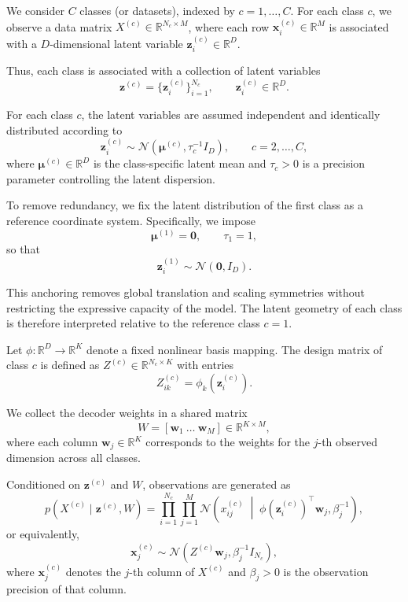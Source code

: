 

\newcommand{\vect}[1]{\bm{#1}}
\newcommand{\normsq}[1]{\left\lVert #1 \right\rVert^2}
\newcommand{\trans}[1]{#1^\top}
\newcommand{\Gam}[3]{\mathrm{Gamma} \left( #1 \;\middle|\; #2, #3\right)}
\newcommand{\Nor}[3]{\mathcal{N} \left( #1 \;\middle|\; #2, #3 \right)}
\newcommand{\avgz}{\overline{z}}
\newcommand{\avgzz}{\overline{zz}}

We consider $C$ classes (or datasets), indexed by $c = 1, \dots, C$.
For each class $c$, we observe a data matrix
$X^{(c)} \in \mathbb{R}^{N_c \times M}$, where each row
$\vect{x}_i^{(c)} \in \mathbb{R}^M$ is associated with a
$D$-dimensional latent variable $\vect{z}_i^{(c)} \in \mathbb{R}^D$.

Thus, each class is associated with a collection of latent variables
\[
    \vect{z}^{(c)} = \{\vect{z}_i^{(c)}\}_{i=1}^{N_c},
    \qquad \vect{z}_i^{(c)} \in \mathbb{R}^D.
\]

For each class $c$, the latent variables are assumed independent and identically distributed according to
\[
    \vect{z}_i^{(c)}
    \sim
    \mathcal{N}\!\left(\vect{\mu}^{(c)}, \tau_c^{-1} I_D \right),
    \qquad
    c = 2, \dots, C,
\]
where $\vect{\mu}^{(c)} \in \mathbb{R}^D$ is the class-specific latent mean and
$\tau_c > 0$ is a precision parameter controlling the latent dispersion.

To remove redundancy, we fix the latent distribution of the first class
as a reference coordinate system.
Specifically, we impose
\[
    \vect{\mu}^{(1)} = \vect{0},
    \qquad
    \tau_1 = 1,
\]
so that
\[
    \vect{z}_i^{(1)} \sim \mathcal{N}(\vect{0}, I_D).
\]

This anchoring removes global translation and scaling symmetries
without restricting the expressive capacity of the model.
The latent geometry of each class is therefore interpreted
relative to the reference class $c=1$.

Let $\phi: \mathbb{R}^D \to \mathbb{R}^K$ denote a fixed nonlinear basis mapping.
The design matrix of class $c$ is defined as
$Z^{(c)} \in \mathbb{R}^{N_c \times K}$ with entries
\[
    Z^{(c)}_{ik} = \phi_k(\vect{z}_i^{(c)}).
\]

We collect the decoder weights in a shared matrix
\[
    W = [\vect{w}_1 \ \dots \ \vect{w}_M]
    \in \mathbb{R}^{K \times M},
\]
where each column $\vect{w}_j \in \mathbb{R}^K$ corresponds to the weights for the $j$-th observed dimension
across all classes.

Conditioned on $\vect{z}^{(c)}$ and $W$, observations are generated as
\[
    p(X^{(c)} \mid \vect{z}^{(c)}, W)
    =
    \prod_{i=1}^{N_c}\prod_{j=1}^M
    \Nor{x_{ij}^{(c)}}{\phi(\vect{z}_i^{(c)})^\top \vect{w}_j}{\beta_j^{-1}},
\]
or equivalently,
\[
    \vect{x}_j^{(c)}
    \sim
    \mathcal{N}\!\left(Z^{(c)} \vect{w}_j, \beta_j^{-1} I_{N_c} \right),
\]
where $\vect{x}_j^{(c)}$ denotes the $j$-th column of $X^{(c)}$
and $\beta_j > 0$ is the observation precision of that column.

